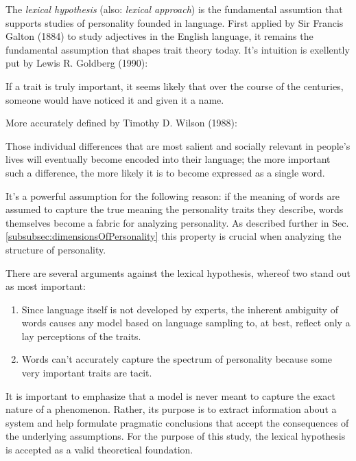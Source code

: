 The \textit{lexical hypothesis} (also: \textit{lexical approach}) is the fundamental assumtion that supports studies of personality founded in language. First applied by Sir Francis Galton (1884) to study adjectives in the English language, it remains the fundamental assumption that shapes trait theory today. It's intuition is exellently put by Lewis R. Goldberg (1990):

\begin{displayquote}
If a trait is truly important, it seems likely that over the course of the centuries, someone would have noticed it and given it a name.
\end{displayquote}
More accurately defined by Timothy D. Wilson (1988):

\begin{displayquote}
Those individual differences that are most salient and socially relevant in people’s lives will eventually become encoded into their language; the more important such a difference, the more likely it is to become expressed as a single word.
\end{displayquote}
It's a powerful assumption for the following reason: if the meaning of words are assumed to capture the true meaning the personality traits they describe, words themselves become a fabric for analyzing personality. As described further in Sec. \ref{subsubsec:dimensionsOfPersonality} this property is crucial when analyzing the structure of personality.

There are several arguments against the lexical hypothesis, whereof two stand out as most important: 
\begin{enumerate}
\item Since language itself is not developed by experts, the inherent ambiguity of words causes any model based on language sampling to, at best, reflect only a lay perceptions of the traits. 
\item Words can't accurately capture the spectrum of personality because some very important traits are tacit.
\end{enumerate}
It is important to emphasize that a model is never meant to capture the exact nature of a phenomenon. Rather, its purpose is to extract information about a system and help formulate pragmatic conclusions that accept the consequences of the underlying assumptions. For the purpose of this study, the lexical hypothesis is accepted as a valid theoretical foundation. 